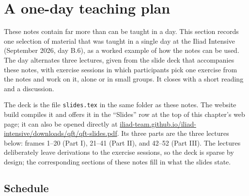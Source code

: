 \documentclass[11pt]{article}
\begin{document}
\section{A one-day teaching plan}
\label{sec:teaching-day}

These notes contain far more than can be taught in a day. This section records one selection of material that was taught in a single day at the Iliad Intensive (September 2026, day B.6), as a worked example of how the notes can be used. The day alternates three lectures, given from the slide deck that accompanies these notes, with exercise sessions in which participants pick one exercise from the notes and work on it, alone or in small groups. It closes with a short reading and a discussion.

The deck is the file \texttt{slides.tex} in the same folder as these notes. The website build compiles it and offers it in the ``Slides'' row at the top of this chapter's web page; it can also be opened directly at \href{https://iliad-team.github.io/iliad-intensive/downloads/qft/qft-slides.pdf}{iliad-team.github.io/iliad-intensive/downloads/qft/qft-slides.pdf}. Its three parts are the three lectures below: frames 1--20 (Part I), 21--41 (Part II), and 42--52 (Part III). The lectures deliberately leave derivations to the exercise sessions, so the deck is sparse by design; the corresponding sections of these notes fill in what the slides state.

\subsection{Schedule}
\label{sec:schedule}
\end{document}
